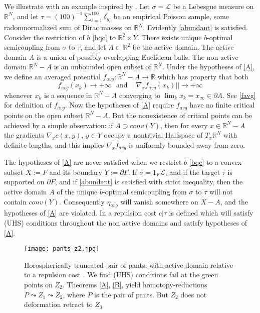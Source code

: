 \documentclass[12pt]{amsart}
\theoremstyle{definition}
\theoremstyle{remark}
\newcommand{\bR}{\mathbb{R}}
\newcommand{\del}{\partial}
\begin{document}
We illustrate with an example inspired by \cite{SturmH}. Let $\sigma=\mathscr{L}$ be a Lebesgue measure on $\bR^N$, and let $\tau=(100)^{-1}\sum_{i=1}^{100} \delta_{y_i}$ be an empirical Poisson sample, some radomnormalized sum of Dirac masses on $\bR^N$. Evidently \eqref{abundant} is satisfied. Consider the restriction of $b$ \eqref{bqc} to $\bR^2 \times Y$. There exists unique $b$-optimal semicoupling from $\sigma$ to $\tau$, and let $A\subset \bR^2$ be the active domain. The active domain $A$ is a union of possibly overlapping Euclidean balls. The non-active domain $\bR^N-A$ is an unbounded open subset of $\bR^N$. Under the hypotheses of \ref{A}, we define an averaged potential $f_{avg}: \bR^N -A \to \bR$ which has property that both $$f_{avg}(x_k)\to +\infty \text{~~and~~}||\nabla_x f_{avg}(x_k)|| \to +\infty $$ whenever $x_k$ is a sequence in $\bR^N-A$ converging to $\lim_k x_k=x_\infty \in \del A$. See \eqref{favg} for definition of $f_{avg}$. Now the hypotheses of \ref{A} require $f_{avg}$ have no finite critical points on the open subset $\bR^N-A$. But the nonexistence of critical points can be achieved by a simple observation: if $A\supset conv(Y)$, then for every $x\in \bR^N-A$ the gradients $\nabla_x c(x,y)$, $y\in Y$ occupy a nontrivial Halfspace of $T_x \bR^N$ with definite lengths, and this implies $\nabla_x f_{avg}$ is uniformly bounded away from zero.

The hypotheses of \ref{A} are never satisfied when we restrict $b$ \eqref{bqc} to a convex subset $X:=F$ and its boundary $Y:=\del F$. If $\sigma=1_F \mathscr{L}$, and if the target $\tau$ is supported on $\del F$, and if \eqref{abundant} is satisfied with strict inequality, then the active domain $A$ of the unique $b$-optimal semicoupling from $\sigma$ to $\tau$ will not contain $conv(Y)$. Consequently $\eta_{avg}$ will vanish somewhere on $X-A$, and the hypotheses of \ref{A} are violated. In \cite[Ch.4]{martel} a repulsion cost $c|\tau$ is defined which will satisfy (UHS) conditions throughout the non active domains and satisfy hypotheses of \ref{A}. 

\begin{figure}
\centering
\texttt{[image: pants-z2.jpg]}
\caption{Horospherically truncated pair of pants, with active domain relative to a repulsion cost \cite[Ch.4]{martel}. We find (UHS) conditions fail at the green points on $Z_2$. Theorems \ref{A}, \ref{B}, yield homotopy-reductions $P \leadsto Z_1 \leadsto Z_2$, where $P$ is the pair of pants. But $Z_2$ does not deformation retract to $Z_3$}
\end{figure}
\end{document}
